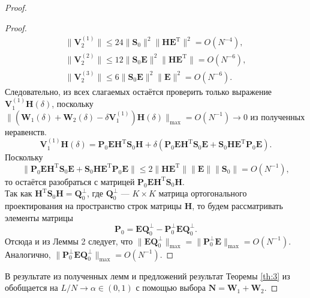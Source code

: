 \documentclass[specialist,
substylefile = spbu_report.rtx,
subf,href,colorlinks=true, 12pt]{disser}
\begin{document}
\begin{proof}
\begin{proof}
\begin{align*}
				\|\mathbf{V}_2^{(1)}\|\leqslant 24\|\mathbf{S}_0\|^2\|\mathbf{HE}^\mathrm{T}\|^2=O(N^{-4}),\\
				\|\mathbf{V}_2^{(2)}\|\leqslant 12\|\mathbf{S}_0\mathbf{E}\|^2\|\mathbf{HE}^\mathrm{T}\|=O(N^{-6}),\\
				\|\mathbf{V}_2^{(3)}\|\leqslant 6\|\mathbf{S}_0\mathbf{E}\|^2\|\mathbf{E}\|^2=O(N^{-6}).
			\end{align*}
			Следовательно, из всех слагаемых остаётся проверить только выражение $\mathbf{V}_1^{(1)}\mathbf{H}(\delta)$, поскольку $\|(\mathbf{W}_1(\delta)+\mathbf{W}_2(\delta)-\delta\mathbf{V}_1^{(1)})\mathbf{H}(\delta)\|_{\max}=O(N^{-1})\rightarrow 0$ из полученных неравенств. 
			\begin{equation*}
				\mathbf{V}_1^{(1)}\mathbf{H}(\delta) = \mathbf{P}_0\mathbf{EH}^\mathrm{T}\mathbf{S}_0\mathbf{H}+\delta(\mathbf{P}_0\mathbf{EH}^\mathrm{T}\mathbf{S}_0\mathbf{E}+\mathbf{S}_0\mathbf{HE}^\mathrm{T}\mathbf{P}_0\mathbf{E}).
			\end{equation*}
			Поскольку
			\begin{equation*}
				\|\mathbf{P}_0\mathbf{EH}^\mathrm{T}\mathbf{S}_0\mathbf{E}+\mathbf{S}_0\mathbf{HE}^\mathrm{T}\mathbf{P}_0\mathbf{E}\|\leqslant 2\|\mathbf{HE}^\mathrm{T}\|\|\mathbf{E}\|\|\mathbf{S}_0\|=O(N^{-1}),
			\end{equation*}
			то остаётся разобраться с матрицей $\mathbf{P}_0\mathbf{EH}^\mathrm{T}\mathbf{S}_0\mathbf{H}$.\\
			Так как $\mathbf{H}^\mathrm{T}\mathbf{S}_0\mathbf{H}=\mathbf{Q}_0^\bot$, где $\mathbf{Q}_0^\bot$ --- $K\times K$ матрица ортогонального проектирования на пространство строк матрицы $\mathbf{H}$, то будем рассматривать элементы матрицы
			\begin{equation*}
				\mathbf{P}_0 = \mathbf{E}\mathbf{Q}_0^\bot - \mathbf{P}_0^\bot\mathbf{E}\mathbf{Q}_0^\bot.
			\end{equation*}
			Отсюда и из Леммы 2 \cite{ZNekrutkin} следует, что $\|\mathbf{E}\mathbf{Q}_0^\bot\|_{\max}=\|\mathbf{P}_0^\bot\mathbf{E}\|_{\max}=O(N^{-1})$. Аналогично, $\|\mathbf{P}_0^\bot\mathbf{E}\mathbf{Q}_0^\bot\|_{\max}=O(N^{-1})$.
		\end{proof}
		В результате из полученных лемм и предложений результат Теоремы \ref{th:3} из \cite{ZNekrutkin} обобщается на $L/N\rightarrow \alpha\in(0, 1)$ с помощью выбора $\mathbf{N} = \mathbf{W}_1 + \mathbf{W}_2$.
	\end{proof} 
\end{document}
